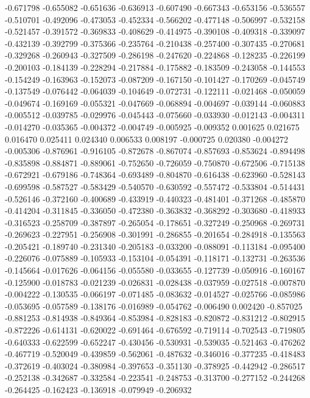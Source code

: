 -0.671798
-0.655082
-0.651636
-0.636913
-0.607490
-0.667343
-0.653156
-0.536557
-0.510701
-0.492096
-0.473053
-0.452334
-0.566202
-0.477148
-0.506997
-0.532158
-0.521457
-0.391572
-0.369833
-0.408629
-0.414975
-0.390108
-0.409318
-0.339097
-0.432139
-0.392799
-0.375366
-0.235764
-0.210438
-0.257400
-0.307435
-0.270681
-0.329268
-0.260943
-0.327509
-0.286198
-0.247620
-0.224868
-0.128235
-0.226199
-0.200103
-0.184139
-0.228294
-0.217884
-0.175882
-0.183509
-0.243058
-0.144553
-0.154249
-0.163963
-0.152073
-0.087209
-0.167150
-0.101427
-0.170269
-0.045749
-0.137549
-0.076442
-0.064039
-0.104649
-0.072731
-0.122111
-0.021468
-0.050059
-0.049674
-0.169169
-0.055321
-0.047669
-0.068894
-0.004697
-0.039144
-0.060883
-0.005512
-0.039785
-0.029976
-0.045443
-0.075660
-0.033930
-0.012143
-0.004311
-0.014270
-0.035365
-0.004372
-0.004749
-0.005925
-0.009352
0.001625
0.021675
0.016470
0.025411
0.024340
0.006533
0.008197
-0.000725
0.020380
-0.004272
-0.005306
-0.876961
-0.916105
-0.872678
-0.867074
-0.857693
-0.853624
-0.894498
-0.835898
-0.884871
-0.889061
-0.752650
-0.726059
-0.750870
-0.672506
-0.715138
-0.672921
-0.679186
-0.748364
-0.693489
-0.804870
-0.616438
-0.623960
-0.528143
-0.699598
-0.587527
-0.583429
-0.540570
-0.630592
-0.557472
-0.533804
-0.514431
-0.526146
-0.372160
-0.400689
-0.433919
-0.440323
-0.481401
-0.371268
-0.485870
-0.414204
-0.311845
-0.336050
-0.472380
-0.363832
-0.368292
-0.303680
-0.418933
-0.316523
-0.258709
-0.387897
-0.265054
-0.178651
-0.327249
-0.250968
-0.269731
-0.269623
-0.227951
-0.256908
-0.301991
-0.286855
-0.201654
-0.284918
-0.135563
-0.205421
-0.189740
-0.231340
-0.205183
-0.033200
-0.088091
-0.113184
-0.095400
-0.226076
-0.075889
-0.105933
-0.153104
-0.054391
-0.118171
-0.132731
-0.263536
-0.145664
-0.017626
-0.064156
-0.055580
-0.033655
-0.127739
-0.050916
-0.160167
-0.125900
-0.018783
-0.021239
-0.026831
-0.028438
-0.037959
-0.027518
-0.007870
-0.004222
-0.130535
-0.066197
-0.071485
-0.083632
-0.014527
-0.025766
-0.085986
-0.053695
-0.057589
-0.138176
-0.016989
-0.054762
-0.006490
0.002420
-0.857025
-0.881253
-0.814938
-0.849364
-0.853984
-0.828183
-0.820872
-0.831212
-0.802915
-0.872226
-0.614131
-0.620022
-0.691464
-0.676592
-0.719114
-0.702543
-0.719805
-0.640333
-0.622599
-0.652247
-0.430456
-0.530931
-0.539035
-0.521463
-0.476262
-0.467719
-0.520049
-0.439859
-0.562061
-0.487632
-0.346016
-0.377235
-0.418483
-0.372619
-0.403024
-0.380984
-0.397653
-0.351130
-0.378925
-0.442942
-0.286517
-0.252138
-0.342687
-0.332584
-0.223541
-0.248753
-0.313700
-0.277152
-0.244268
-0.264425
-0.162423
-0.136918
-0.079949
-0.206932

